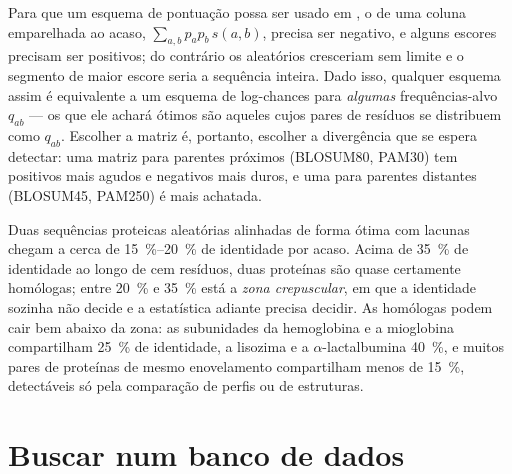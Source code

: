 \begin{proposition}\label{prop:b3:bioinformatics:logodds}
Para que um esquema de pontuação possa ser usado em ,
o  de uma coluna emparelhada ao acaso,
$\sum_{a,b} p_{a} p_{b}\, s(a,b)$, precisa ser negativo, e alguns
escores precisam ser positivos; do contrário os 
aleatórios cresceriam sem limite e o segmento de maior escore seria a
sequência inteira. Dado isso, qualquer esquema assim é equivalente a
um esquema de log-chances para \emph{algumas} frequências-alvo
$q_{ab}$ --- os  que ele achará ótimos são aqueles cujos
pares de resíduos se distribuem como $q_{ab}$. Escolher a matriz é,
portanto, escolher a divergência que se espera detectar: uma matriz
para parentes próximos (BLOSUM80, PAM30) tem positivos mais agudos e
negativos mais duros, e uma para parentes distantes (BLOSUM45, PAM250)
é mais achatada.
\end{proposition}
\admitted

\begin{example}\label{ex:b3:bioinformatics:twilight}
Duas sequências proteicas aleatórias alinhadas de forma ótima com
lacunas chegam a cerca de \qtyrange{15}{20}{\%} de identidade por
acaso. Acima de \qty{35}{\%} de identidade ao longo de cem resíduos,
duas proteínas são quase certamente homólogas; entre \qty{20}{\%} e
\qty{35}{\%} está a \emph{zona crepuscular}, em que a identidade
sozinha não decide e a estatística adiante precisa decidir. As
homólogas podem cair bem abaixo da zona: as subunidades da
hemoglobina e a mioglobina compartilham \qty{25}{\%} de identidade, a
lisozima e a $\alpha$-lactalbumina \qty{40}{\%}, e muitos pares de
proteínas de mesmo enovelamento compartilham menos de \qty{15}{\%},
detectáveis só pela comparação de perfis ou de estruturas.
\end{example}

\section{Buscar num banco de dados}

